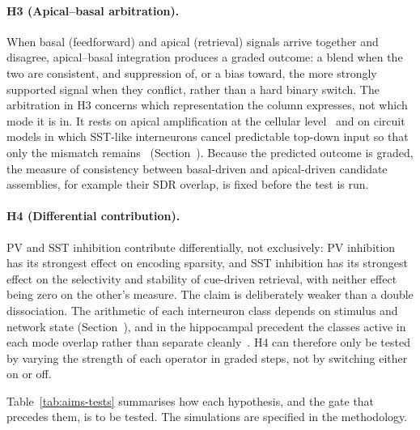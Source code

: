 \paragraph{H3 (Apical--basal arbitration).} When basal (feedforward) and apical
(retrieval) signals arrive together and disagree, apical--basal integration
produces a graded outcome: a blend when the two are consistent, and suppression
of, or a bias toward, the more strongly supported signal when they conflict,
rather than a hard binary switch. The arbitration in H3 concerns which
representation the column expresses, not which mode it is in. It rests on
apical amplification at the cellular level~\cite{larkum2013} and on circuit models
in which SST-like interneurons cancel predictable top-down input so that only
the mismatch remains~\cite{sacramento2018dendritic}
(Section~). Because the predicted outcome is graded,
the measure of consistency between basal-driven and apical-driven candidate
assemblies, for example their SDR overlap, is fixed before the test is run.

\paragraph{H4 (Differential contribution).} PV and SST inhibition contribute
differentially, not exclusively: PV inhibition has its strongest effect on
encoding sparsity, and SST inhibition has its strongest effect on the
selectivity and stability of cue-driven retrieval, with neither effect being
zero on the other's measure. The claim is deliberately weaker than a double
dissociation. The arithmetic of each interneuron class depends on stimulus and
network state (Section~), and in the hippocampal
precedent the classes active in each mode overlap rather than separate
cleanly~\cite{cutsuridis2010encoding}. H4 can therefore only be tested by varying
the strength of each operator in graded steps, not by switching either on or
off.

Table~\ref{tab:aims-tests} summarises how each hypothesis, and the gate that
precedes them, is to be tested. The simulations are specified in the
methodology.

